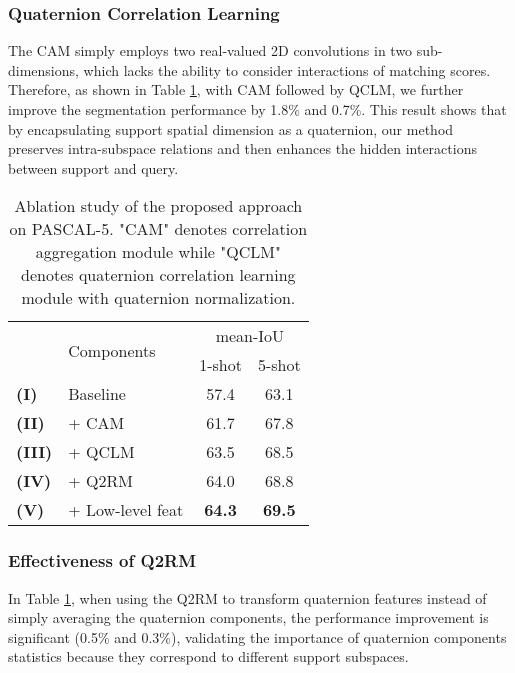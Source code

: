 \documentclass[lettersize,journal]{IEEEtran}
\begin{document}
\subsubsection{Quaternion Correlation Learning}
The CAM simply employs two real-valued 2D convolutions in two sub-dimensions, which lacks the ability to consider interactions of matching scores. Therefore, as shown in Table \ref{tab5}, with CAM followed by QCLM, we further improve the segmentation performance by 1.8\% and 0.7\%. This result shows that by encapsulating support spatial dimension as a quaternion, our method preserves intra-subspace relations and then enhances the hidden 
interactions between support and query. 

\begin{table}
\centering
\caption{Ablation study of the proposed approach on PASCAL-5. "CAM" denotes correlation aggregation module while "QCLM" denotes quaternion correlation learning module with quaternion normalization.  \label{tab5}}
\begin{tabular}{ll|cc} 
\hline
\multirow{2}{*}{} & \multirow{2}{*}{Components} & \multicolumn{2}{c}{mean-IoU}  \\ 
\cline{3-4}
                  & \multicolumn{1}{c|}{}                            & 1-shot & 5-shot               \\ 
\hline
\textbf{(I)}           & Baseline                                         & 57.4   & 63.1                 \\
\textbf{(II)}           & + CAM                                            & 61.7   & 67.8                 \\
\textbf{(III)}           & + QCLM                                           & 63.5   & 68.5                 \\
\textbf{(IV)}           & + Q2RM                                           & 64.0   & 68.8                 \\
\textbf{(V)}           & + Low-level feat                                 & \textbf{64.3}   & \textbf{69.5}                \\
\hline
\end{tabular}
\end{table}

\subsubsection{Effectiveness of Q2RM}
In Table \ref{tab5}, when using the Q2RM to transform quaternion features instead of simply averaging the quaternion components, the performance improvement is significant (0.5\% and 0.3\%), validating the importance of quaternion components statistics because they correspond to different support subspaces. 
\end{document}
